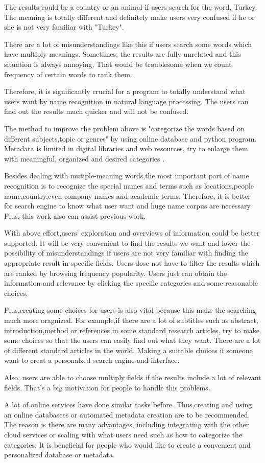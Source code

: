 The results could be a country or an animal if users search for the word, Turkey. The meaning is totally different and
definitely make users very confused if he or she is not very familiar with "Turkey". 

There are a lot of misunderstandings like this if users search some words which have multiply meanings.
Sometimes, the results are fully unrelated and this situation is always annoying. 
That would be troublesome when we count frequency of certain words to rank them.

Therefore, it is significantly crucial for a program to totally understand what users want by name recognition in natural language processing. 
The users can find out the results much quicker and will not be confused.

The method to improve the problem above is "categorize the words based on different subjects,topic or genres" by using online database and python program.
Metadata is limited in digital libraries and web resources, try to enlarge them with meaningful, organized and desired
categories \cite{Kules2006}.

Besides dealing with mutiple-meaning words,the most important part of name recognition is to recognize the special names and terms such as locations,people name,country,even company names and academic terms.
Therefore, it is better for search engine to know what user want and huge name corpus are necessary. Plus, this work also can assist previous work.

With above effort,users' exploration and overviews of information could be better supported. 
It will be very convenient to find the results we want and lower the possibility of misunderstandings if users are not 
very familiar with finding the appropriate result in specific fields.\cite{TunThuraThet2010} 
Users dose not have to filter the results which are ranked by browsing frequency popularity. 
Users just can obtain the information and relevance by clicking the specific categories and some reasonable choices.

Plus,creating some choices for users is also vital because this make the searching much more oragnized.
For example,if there are a lot of subtitles such as abstract, introduction,method or references in some standard research 
articles, try to make some choices so that the users can easily find out what they want.
There are a lot of different standard articles in the world.
Making a suitable choices if someone want to creat a personalzed search engine and interface. 

Also, users are able to choose multiply fields if the results include a lot of relevant fields. 
That's a big motivation for people to handle this problems. 

A lot of online services have done similar tasks before.
Thus,creating and using an online databasees or automated metadata creation are to be recommended.
The reason is there are many advantages, including integrating with the other cloud services or scaling with what users 
need such as how to categorize the categories.
It is beneficial for people who would like to create a convenient and personalized database or metadata.\\




